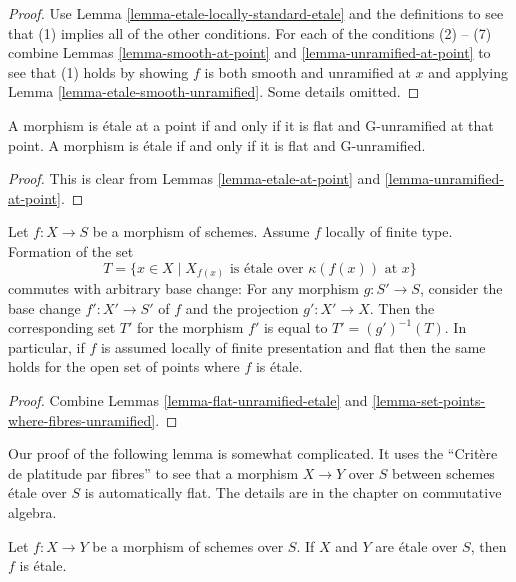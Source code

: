 \begin{proof}
Use Lemma \ref{lemma-etale-locally-standard-etale}
and the definitions to see that (1) implies all
of the other conditions. For each of the conditions
(2) -- (7) combine Lemmas \ref{lemma-smooth-at-point}
and \ref{lemma-unramified-at-point} to see
that (1) holds by showing $f$ is both smooth and unramified
at $x$ and applying Lemma \ref{lemma-etale-smooth-unramified}.
Some details omitted.
\end{proof}

\begin{lemma}
\label{lemma-flat-unramified-etale}
A morphism is \'etale at a point if and only if it is flat and G-unramified
at that point.
A morphism is \'etale if and only if it is flat and G-unramified.
\end{lemma}

\begin{proof}
This is clear from Lemmas \ref{lemma-etale-at-point}
and \ref{lemma-unramified-at-point}.
\end{proof}

\begin{lemma}
\label{lemma-set-points-where-fibres-etale}
Let $f : X \to S$ be a morphism of schemes.
Assume $f$ locally of finite type. Formation of the set
$$
T = \{x \in X \mid
X_{f(x)}\text{ is \'etale over }\kappa(f(x))\text{ at }x\}
$$
commutes with arbitrary base change:
For any morphism $g : S' \to S$, consider
the base change $f' : X' \to S'$ of $f$ and the
projection $g' : X' \to X$. Then the corresponding
set $T'$ for the morphism $f'$ is equal to $T' = (g')^{-1}(T)$.
In particular, if $f$ is assumed locally of finite
presentation and flat then the same holds for the open set of points
where $f$ is \'etale.
\end{lemma}

\begin{proof}
Combine
Lemmas \ref{lemma-flat-unramified-etale} and
\ref{lemma-set-points-where-fibres-unramified}.
\end{proof}

\noindent
Our proof of the following lemma is somewhat complicated.
It uses the ``Crit\`ere de platitude par fibres'' to see that
a morphism $X \to Y$ over $S$ between schemes \'etale over $S$
is automatically flat. The details are in the chapter on commutative algebra.

\begin{lemma}
\label{lemma-etale-permanence}
Let $f : X \to Y$ be a morphism of schemes over $S$.
If $X$ and $Y$ are \'etale over $S$, then
$f$ is \'etale.
\end{lemma}

